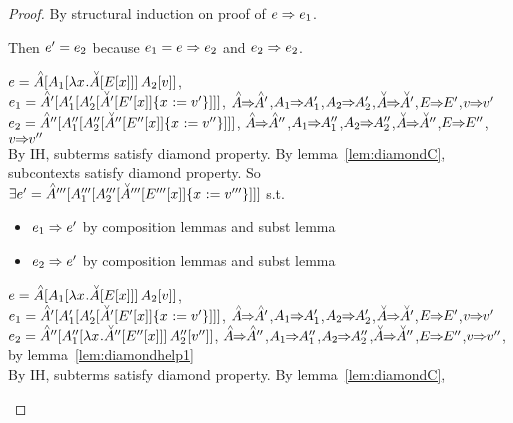 \documentclass{article}
\begin{document}
\newcommand{\IH}[2][']{\ensuremath{#2 \!\!\pstep\!\! #2#1}}
\begin{proof}
By structural induction on proof of $\e \pstep \e_1$.
\begin{byCases}
  Then $\e' = \e_2$ because $\e_1 = \e \pstep \e_2$ and $\e_2 \pstep \e_2$.
  \renewcommand{\byCasesCaseTemplate}[1]{\textbf{Subcase {#1}.}}
  \begin{byCases}
    $\e   = \inAp{\ap{\inA[_1]{\lx\inAm{\Ex}}}{\Av[_2]}}$,\\
    $\e_1 = \inAp[']{\inA[_1']{\inA[_2']{\substx{\inAm[']{\Ex[']}}{\val'}}}}$,
    \;\;\;\;\IH{\Ap},\IH{\A_1},\IH{\A_2},\IH{\Am},\IH{\E},\IH{\val}\\
    $\e_2 = \inAp['']{\inA[_1'']{\inA[_2'']{\substx{\inAm['']{\Ex['']}}
                                                  {\val''}}}}$,
    \;\IH['']{\Ap},\IH['']{\A_1},\IH['']{\A_2},\IH['']{\Am},\IH['']{\E},\IH['']{\val}\\
    By IH, subterms satisfy diamond property. By lemma~\ref{lem:diamondC},
    subcontexts satisfy diamond property.
    So $\exists 
        \e' = \inAp[''']{\inA[_1''']{\inA[_2''']{\substx{\inAm[''']{\Ex[''']}}
                                                        {\val'''}}}}$ s.t.
    \begin{itemize}
      \item $\e_1 \pstep \e'$ by composition lemmas and subst lemma
      \item $\e_2 \pstep \e'$ by composition lemmas and subst lemma
    \end{itemize}
    $\e   = \inAp{\ap{\inA[_1]{\lx\inAm{\Ex}}}{\Av[_2]}}$,\\
    $\e_1 = \inAp[']{\inA[_1']{\inA[_2']{\substx{\inAm[']{\Ex[']}}{\val'}}}}$,
    \;\IH{\Ap},\IH{\A_1},\IH{\A_2},\IH{\Am},\IH{\E},\IH{\val}\\
    $\e_2 = \inAp['']{\ap{\inA[_1'']{\lx\inAm['']{\Ex['']}}}
                         {\inA[_2'']{\val''}}}$, 
    \;\;\;\IH['']{\Ap},\IH['']{\A_1},\IH['']{\A_2},\IH['']{\Am},\IH['']{\E},\IH['']{\val}, 
    by lemma~\ref{lem:diamondhelp1} \\
    By IH, subterms satisfy diamond property. By lemma~\ref{lem:diamondC},

\end{byCases}
\end{byCases}
\end{proof}
\end{document}
